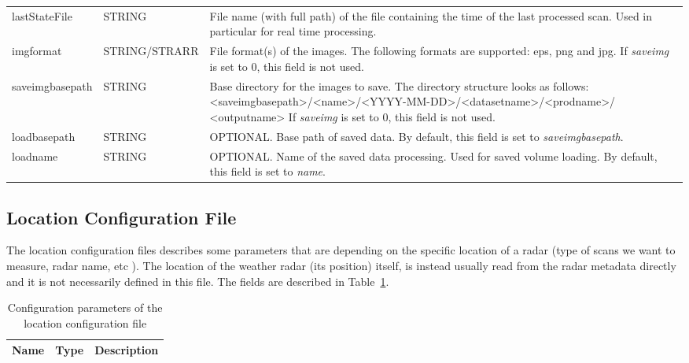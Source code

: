 \documentclass[a4paper,11pt,pdftex,twoside]{scrartcl}
\renewcommand{\bf}{\normalfont \bfseries}
\begin{document}
{{{\begin{longtable}{p{}p{}p{}}
lastStateFile      & STRING    & File name (with full path) of the file containing the time
                                 of the last processed scan. Used in particular for real time
                                  processing.\\
imgformat          & STRING/STRARR  & File format(s) of the images. The following formats are supported:
                                 eps, png and jpg. If \emph{saveimg} is set to 0, this field is
                                 not used.\\
saveimgbasepath    & STRING    & Base directory for the images to save. The directory structure
                                 looks as follows:
                                 <saveimgbasepath>/<name>/<YYYY-MM-DD>/<datasetname>/<prodname>/
                                 <outputname>
                                 If \emph{saveimg} is set to 0, this field is not used.\\
loadbasepath       & STRING    & OPTIONAL. Base path of saved data. By default, this field is set to
                                 \emph{saveimgbasepath}.\\
loadname           & STRING    & OPTIONAL. Name of the saved data processing. Used for saved volume loading.
                                 By default, this field is set to \emph{name}.\\
\end{longtable}

\subsection{Location Configuration File}
\label{subsec_location_config}

The location configuration files describes some parameters that are depending on the specific location of a radar (type of scans we want to measure, radar name, etc ). The location of the weather
radar (its position) itself, is instead usually read from the radar metadata directly and it is not necessarily defined in this file.
The fields are described in Table~\ref{tab_location_config_params}.

\begin{longtable}{p{}p{}p{}}
\caption{Configuration parameters of the location configuration file}\\
\label{tab_location_config_params}
\bf{Name}          & \bf{Type} & \bf{Description}\\
\hline
\endfirsthead


\end{longtable}}}}
\end{document}
